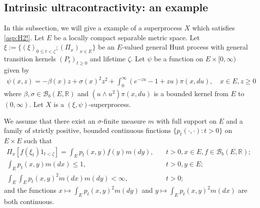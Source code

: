 \documentclass[12pt,a4paper]{amsart}
\numberwithin{equation}{section}
\theoremstyle{plain}
\theoremstyle{definition}
\theoremstyle{remark}
\begin{document}
\subsection{Intrinsic ultracontractivity: an example}
	In this subsection, we will give a example of a superprocess $X$ which satisfies \eqref{asp:H2!}.
	Let $E$ be a locally compact separable metric space.
	Let $\xi:= \{(\xi)_{0\leq t < \zeta}; (\Pi_x)_{x\in E}\}$ be an $E$-valued general Hunt process with general transition kernels $(P_t)_{t\geq 0}$ and lifetime $\zeta$.
	Let $\psi$ be a function on $E \times [0,\infty)$ given by
\begin{align}
	\psi(x,z)
	=- \beta(x) z + \sigma(x)^2 z^2 + \int_0^\infty (e^{-zu} -1 + zu) \pi(x,du),
	\quad x\in E, z\geq 0
\end{align}
	where $\beta, \sigma \in \mathcal B_b(E,\mathbb R)$ and $(u \wedge u^2) \pi(x,du)$ is a bounded kernel from $E$ to $(0,\infty)$.
	Let $X$ is a $(\xi, \psi)$-superprocess.

	We assume  that there exist an $\sigma$-finite measure $m$ with full support on $E$ and a family of strictly positive, bounded continuous finctions $\{p_t(\cdot,\cdot): t>0\}$ on $E\times E$ such that
\begin{align}
	\Pi_x[f(\xi_t) 1_{t< \zeta}] = \int_E p_t(x,y) f(y)m(dy), & \quad t>0, x\in E, f\in \mathcal B_b(E,\mathbb R);
	\\ \int_E p_t(x,y) m(dx) \leq 1, &\quad t>0, y\in E;
	\\ \int_E \int_E p_t(x,y)^2 m(dx)m(dy) < \infty, &\quad t>0;
\end{align}
	and the functions $x \mapsto \int_E p_t(x,y)^2m(dy)$ and $y\mapsto \int_E p_t(x,y)^2m(dx)$ are both continuous.
\end{document}
